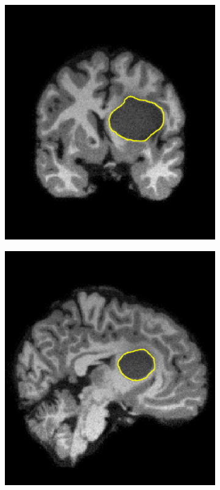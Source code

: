 \begin{figure}
\begin{subfigure}{0.32\textwidth}
        \includegraphics[width=\textwidth]{statistical_normals/images/tumour_example_coronal}
    \end{subfigure}
    \begin{subfigure}{0.32\columnwidth}
        \includegraphics[width=\textwidth]{statistical_normals/images/tumour_example_sagital}

\end{subfigure}
\end{figure}
